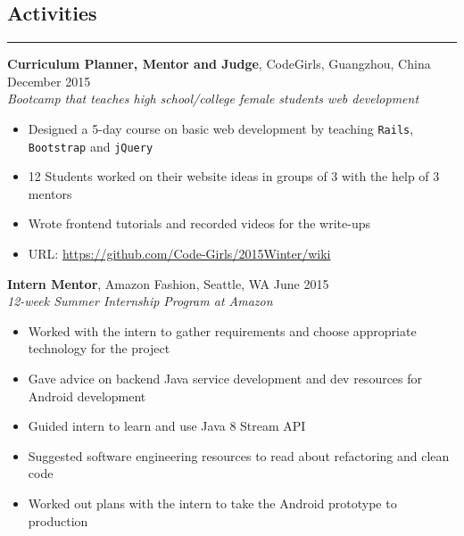 \documentclass[line]{res} %
\begin{document}
\begin{resume}
  \section{Activities}
  \rule{\textwidth}{1pt}
    \textbf{Curriculum Planner, Mentor and Judge}, CodeGirls, Guangzhou, China
    \hfill December 2015 \\
    \textit{Bootcamp that teaches high school/college female students web development}
    \begin{itemize} \itemsep -2pt  %
      \item Designed a 5-day course on basic web development by teaching \texttt{Rails},
      \texttt{Bootstrap} and \texttt{jQuery}
      \item 12 Students worked on their website ideas in groups of 3 with the help of 3 mentors
      \item Wrote frontend tutorials and recorded videos for the write-ups
      \item URL: \underline{https://github.com/Code-Girls/2015Winter/wiki}
    \end{itemize}

    \textbf{Intern Mentor}, Amazon Fashion, Seattle, WA
    \hfill June 2015 \\
    \textit{12-week Summer Internship Program at Amazon}
    \begin{itemize} \itemsep -2pt  %
      \item Worked with the intern to gather requirements and choose appropriate
            technology for the project
      \item Gave advice on backend Java service development and dev resources
            for Android development
      \item Guided intern to learn and use Java 8 Stream API
      \item Suggested software engineering resources to read about refactoring and clean code
      \item Worked out plans with the intern to take the Android prototype to production
    \end{itemize}

\end{resume}
\end{document}
